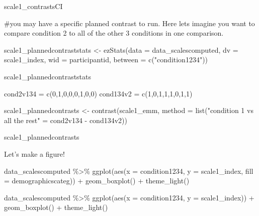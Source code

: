 \documentclass[
  letterpaper,
  DIV=11,
  numbers=noendperiod]{scrreprt}
\newenvironment{Shaded}{\begin{snugshade}}{\end{snugshade}}
\newcommand{\AttributeTok}[1]{\textcolor[rgb]{0.40,0.45,0.13}{#1}}
\newcommand{\CommentTok}[1]{\textcolor[rgb]{0.37,0.37,0.37}{#1}}
\newcommand{\DecValTok}[1]{\textcolor[rgb]{0.68,0.00,0.00}{#1}}
\newcommand{\FunctionTok}[1]{\textcolor[rgb]{0.28,0.35,0.67}{#1}}
\newcommand{\NormalTok}[1]{\textcolor[rgb]{0.00,0.23,0.31}{#1}}
\newcommand{\OtherTok}[1]{\textcolor[rgb]{0.00,0.23,0.31}{#1}}
\newcommand{\SpecialCharTok}[1]{\textcolor[rgb]{0.37,0.37,0.37}{#1}}
\newcommand{\StringTok}[1]{\textcolor[rgb]{0.13,0.47,0.30}{#1}}
\begin{document}
\begin{Shaded}
\begin{Highlighting}[]
\NormalTok{scale1\_contrastsCI}

\CommentTok{\#you may have a specific planned contrast to run. Here let\textquotesingle{}s imagine you want to compare condition 2 to all of the other 3 conditions in one comparison.}

\NormalTok{scale1\_plannedcontraststats }\OtherTok{\textless{}{-}} \FunctionTok{ezStats}\NormalTok{(}\AttributeTok{data =}\NormalTok{ data\_scalescomputed, }
                            \AttributeTok{dv =}\NormalTok{ scale1\_index,}
                            \AttributeTok{wid =}\NormalTok{ participantid,}
                            \AttributeTok{between =} \FunctionTok{c}\NormalTok{(}\StringTok{"condition1234"}\NormalTok{))}

\NormalTok{scale1\_plannedcontraststats}

\NormalTok{cond2v134 }\OtherTok{=} \FunctionTok{c}\NormalTok{(}\DecValTok{0}\NormalTok{,}\DecValTok{1}\NormalTok{,}\DecValTok{0}\NormalTok{,}\DecValTok{0}\NormalTok{,}\DecValTok{0}\NormalTok{,}\DecValTok{1}\NormalTok{,}\DecValTok{0}\NormalTok{,}\DecValTok{0}\NormalTok{)}
\NormalTok{cond134v2 }\OtherTok{=} \FunctionTok{c}\NormalTok{(}\DecValTok{1}\NormalTok{,}\DecValTok{0}\NormalTok{,}\DecValTok{1}\NormalTok{,}\DecValTok{1}\NormalTok{,}\DecValTok{1}\NormalTok{,}\DecValTok{0}\NormalTok{,}\DecValTok{1}\NormalTok{,}\DecValTok{1}\NormalTok{)}

\NormalTok{scale1\_plannedcontrasts }\OtherTok{\textless{}{-}} \FunctionTok{contrast}\NormalTok{(scale1\_emm, }\AttributeTok{method =} \FunctionTok{list}\NormalTok{(}\StringTok{"condition 1 vs all the rest"} \OtherTok{=}\NormalTok{ cond2v134 }\SpecialCharTok{{-}}\NormalTok{ cond134v2))}
  
\NormalTok{scale1\_plannedcontrasts}
\end{Highlighting}
\end{Shaded}

Let's make a figure!

\begin{Shaded}
\begin{Highlighting}[]
\NormalTok{data\_scalescomputed }\SpecialCharTok{\%\textgreater{}\%}
  \FunctionTok{ggplot}\NormalTok{(}\FunctionTok{aes}\NormalTok{(}\AttributeTok{x =}\NormalTok{ condition1234, }\AttributeTok{y =}\NormalTok{ scale1\_index, }\AttributeTok{fill =}\NormalTok{ demographicscateg)) }\SpecialCharTok{+}
  \FunctionTok{geom\_boxplot}\NormalTok{() }\SpecialCharTok{+}
  \FunctionTok{theme\_light}\NormalTok{()}


\NormalTok{data\_scalescomputed }\SpecialCharTok{\%\textgreater{}\%}
  \FunctionTok{ggplot}\NormalTok{(}\FunctionTok{aes}\NormalTok{(}\AttributeTok{x =}\NormalTok{ condition1234, }\AttributeTok{y =}\NormalTok{ scale1\_index)) }\SpecialCharTok{+}
  \FunctionTok{geom\_boxplot}\NormalTok{() }\SpecialCharTok{+}
  \FunctionTok{theme\_light}\NormalTok{()}
\end{Highlighting}
\end{Shaded}
\end{document}
